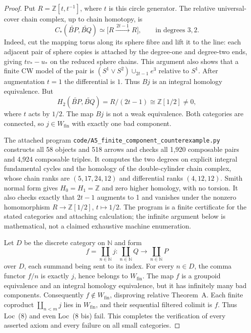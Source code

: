 \begin{proof}
Put $R=\mathbb Z[t,t^{-1}]$, where $t$ is this circle generator.
The relative universal-cover chain complex, up to chain homotopy, is
\[
 C_*(\widetilde{BP},\widetilde{BQ})\simeq
       \bigl[R\xrightarrow{\,2t-1\,}R\bigr],
              \qquad\text{in degrees }3,2.
\]
Indeed, cut the mapping torus along its sphere fibre and lift it to
the line: each adjacent pair of sphere copies is attached by the
degree-one and degree-two ends, giving $t v_*-u_*$ on the reduced
sphere chains.  This argument also shows that a finite CW model of the
pair is $(S^1\vee S^2)\cup_{2t-1}e^3$ relative to $S^1$.
After augmentation $t=1$ the differential is $1$.  Thus $Bj$ is an
integral homology equivalence.  But
\[
 H_2(\widetilde{BP},\widetilde{BQ})
    =R/(2t-1)\cong\mathbb Z[1/2]\ne0,
\]
where $t$ acts by $1/2$.  The map $Bj$ is not a weak equivalence.
Both categories are connected, so $j\in W_{\mathrm{fin}}$ with exactly
one bad component.

The attached program
\texttt{code/A5\_finite\_component\_counterexample.py} constructs all
58 objects and 518 arrows and checks all 1,920 composable pairs and
4,924 composable triples.  It computes the two degrees on explicit
integral fundamental cycles and the homology of the double-cylinder
chain complex, whose chain ranks are $(5,17,24,12)$ and differential
ranks $(4,12,12)$.  Smith normal form gives $H_0=H_1=\mathbb Z$ and
zero higher homology, with no torsion.  It also checks exactly that
$2t-1$ augments to 1 and vanishes under the nonzero homomorphism
$R\to\mathbb Z[1/2]$, $t\mapsto1/2$.  The program is a finite
certificate for the stated categories and attaching calculation;
the infinite argument below is mathematical, not a claimed exhaustive
machine enumeration.

Let $D$ be the discrete category on $\mathbb N$ and form
\[
 f=\coprod_{n\in\mathbb N}j:
       \coprod_{n\in\mathbb N}Q\longrightarrow
       \coprod_{n\in\mathbb N}P
\]
over $D$, each summand being sent to its index.  For every $n\in D$,
the comma functor $f/n$ is exactly $j$, hence belongs to
$W_{\mathrm{fin}}$.  The map $f$ is a groupoid equivalence and an
integral homology equivalence, but it has infinitely many bad components.
Consequently $f\notin W_{\mathrm{fin}}$, disproving relative
Theorem~A.  Each finite coproduct $\coprod_{n<m}j$ lies in
$W_{\mathrm{fin}}$, and their sequential filtered colimit is $f$.
Thus Loc~(8) and even Loc~(8 bis) fail.  This completes the verification
of every asserted axiom and every failure on all small categories.
\end{proof}

